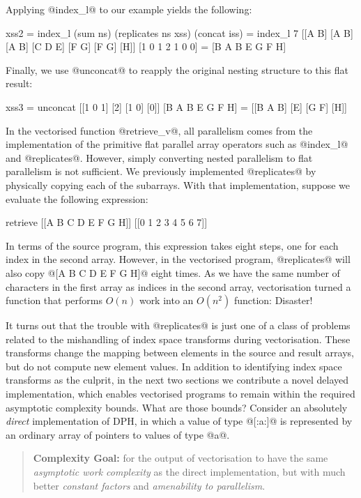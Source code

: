\eject
Applying @index_l@ to our example yields the following:
%
\begin{small}
\begin{code}
 xss2 
  = index_l (sum ns) (replicates ns xss) (concat iss)
  = index_l 7 [[A B] [A B] [A B] [C D E] [F G] [F G] [H]]
              [1      0     1    2       1     0     0]
  = [B A B E G F H]
\end{code}
\end{small}
%
Finally, we use @unconcat@ to reapply the original nesting structure to this flat result:
%
\begin{small}
\begin{code}
 xss3 = unconcat [[1 0 1] [2] [1 0] [0]] [B A B E G F H]
      = [[B A B] [E] [G F] [H]]
\end{code}
\end{small}
%
In the vectorised function @retrieve_v@, all parallelism comes from the implementation of the primitive flat parallel array operators such as @index_l@ and @replicates@. However, simply converting nested parallelism to flat parallelism is not sufficient. We previously implemented @replicates@ by physically copying each of the subarrays. With that implementation, suppose we evaluate the following expression:
%
\begin{small}
\begin{code}
  retrieve [[A B C D E F G H]] [[0 1 2 3 4 5 6 7]]
\end{code}
\end{small}
%
In terms of the source program, this expression takes eight steps, one for each index in the second array. However, in the vectorised program, @replicates@ will also copy @[A B C D E F G H]@ eight times. As we have the same number of characters in the first array as indices in the second array, vectorisation turned a function that performs $O(n)$ work into an $O(n^2)$ function: Disaster! 

It turns out that the trouble with @replicates@ is just one of a class of problems related to the mishandling of index space transforms during vectorisation. These transforms change the mapping between elements in the source and result arrays, but do not compute new element values. In addition to identifying index space transforms as the culprit, in the next two sections we contribute a novel delayed implementation, which enables vectorised programs to remain within the required asymptotic complexity bounds. What are those bounds? Consider an absolutely \emph{direct} implementation of DPH, in which a value of type @[:a:]@ is represented by an ordinary array of pointers to values of type @a@.
%
\begin{quote}
{\bf Complexity Goal:} for the output of vectorisation to have the same \emph{asymptotic work complexity} as the direct implementation, but with much better \emph{constant factors} and \emph{amenability to parallelism}.
\end{quote}


